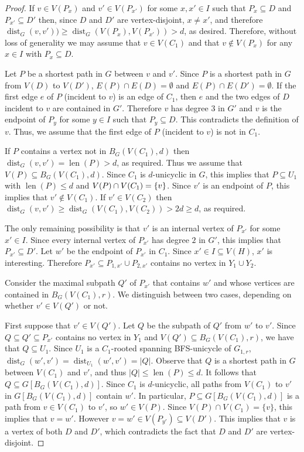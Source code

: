 \documentclass{patmorin}
\DeclareMathOperator{\len}{len}
\DeclareMathOperator{\dist}{dist}
\DeclarePairedDelimiter\set{\{}{\}}
\begin{document}
\begin{proof}
  If $v\in V(P_x)$ and $v'\in V(P_{x'})$ for some  $x,x' \in I$ such that $P_x\subseteq D$ and $P_{x'}\subseteq D'$ then, since $D$ and $D'$ are vertex-disjoint, $x\neq x'$, and therefore $\dist_G(v,v'))\ge  \dist_G(V(P_x),V(P_{x'}))>d$, as desired.  Therefore, without loss of generality we may assume that $v\in V(C_1)$ and that $v\notin V(P_x)$ for any $x\in I$ with $P_x\subseteq D$.

  Let $P$ be a shortest path in $G$ between $v$ and $v'$.  Since $P$ is a shortest path in $G$ from $V(D)$ to $V(D')$, $E(P)\cap E(D)=\emptyset$ and $E(P)\cap E(D')=\emptyset$.  If the first edge $e$ of $P$ (incident to $v$) is an edge of $C_1$, then $e$ and the two edges of $D$ incident to $v$ are contained in $G'$. Therefore $v$ has degree $3$ in $G'$ and $v$ is the endpoint of $P_y$ for some $y\in I$ such that $P_y\subseteq D$.  This contradicts the definition of $v$. Thus, we assume that the first edge of $P$ (incident to $v$) is not in $C_1$.

  If $P$ contains a vertex not in $B_G(V(C_1),d)$ then $\dist_G(v,v')=\len(P)>d$, as required.  Thus we assume that $V(P)\subseteq B_G(V(C_1),d)$. Since $C_1$ is $d$-unicyclic in $G$, this implies that $P\subseteq U_1$ with $\len(P)\leq d$ and $V(P)\cap V(C_1)=\set{v}$. Since $v'$ is an endpoint of $P$, this implies that $v'\notin V(C_1)$.  If $v'\in V(C_2)$ then $\dist_G(v,v')\ge \dist_G(V(C_1),V(C_2))>2d\geq d$, as required.

  The only remaining possibility is that $v'$ is an internal vertex of $P_{x'}$ for some $x'\in I$.  Since every internal vertex of $P_{x'}$ has degree $2$ in $G'$, this implies that  $P_{x'}\subseteq D'$. Let $w'$ be the endpoint of $P_{x'}$ in $C_1$. Since $x'\in I\subseteq V(H)$, $x'$ is interesting. Therefore $P_{x'}\subseteq P_{1,x'}\cup P_{2,x'}$ contains no vertex in $Y_1\cup Y_2$.

  Consider the maximal subpath $Q'$ of $P_{x'}$ that contains $w'$ and whose vertices are contained in $B_G(V(C_1),r)$.  We distinguish between two cases, depending on whether $v'\in V(Q')$ or not.

  First suppose that $v'\in V(Q')$. Let $Q$ be the subpath of $Q'$ from $w'$ to $v'$. Since $Q\subseteq Q'\subseteq P_{x'}$ contains  no vertex in $Y_1$ and $V(Q')\subseteq B_G(V(C_1),r)$, we have that $Q\subseteq U_1$. Since $U_1$ is a $C_1$-rooted spanning BFS-unicycle of $G_{1,r}$, $\dist_G(w',v')=\dist_{U_1}(w',v')=|Q|$. Observe that $Q$ is a shortest path in $G$ between $V(C_1)$ and $v'$, and thus $|Q| \leq \len(P) \leq d$. It follows that $Q\subseteq G[B_G(V(C_1),d)]$. Since $C_1$ is $d$-unicyclic, all paths from $V(C_1)$ to $v'$ in $G[B_G(V(C_1),d)]$ contain $w'$. In particular, $P\subseteq G[B_G(V(C_1),d)]$ is a path from $v\in V(C_1)$ to $v'$, so $w'\in V(P)$.  Since $V(P)\cap V(C_1)=\{v\}$, this implies that $v=w'$. However $v=w' \in V(P_{y'})\subseteq V(D')$. This implies that $v$ is a vertex of both $D$ and $D'$, which contradicts the fact that $D$ and $D'$ are vertex-disjoint.


\end{proof}
\end{document}
